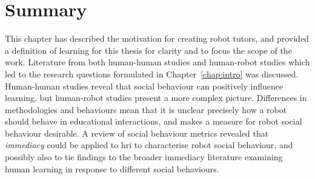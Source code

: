 \section{Summary}\label{sec:background-summary}
This chapter has described the motivation for creating robot tutors, and provided a definition of learning for this thesis for clarity and to focus the scope of the work. Literature from both human-human studies and human-robot studies which led to the research questions formulated in Chapter~\ref{chap:intro} was discussed. Human-human studies reveal that social behaviour can positively influence learning, but human-robot studies present a more complex picture. Differences in methodologies and behaviours mean that it is unclear precisely how a robot should behave in educational interactions, and makes a measure for robot social behaviour desirable. A review of social behaviour metrics revealed that \textit{\gls{immediacy}} could be applied to \acrshort{hri} to characterise robot social behaviour, and possibly also to tie findings to the broader \gls{immediacy} literature examining human learning in response to different social behaviours.